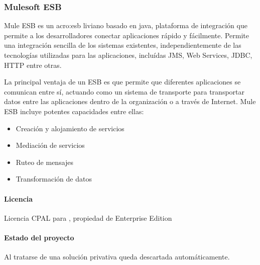 \subsubsection{Mulesoft ESB}
\label{soa:tecnologias:mulesoft-esb}

Mule ESB es un \gls{acro:esb} liviano basado en java, plataforma de integración que permite a los desarrolladores conectar aplicaciones rápido y fácilmente.  Permite una integración sencilla de los sistemas existentes, independientemente de las tecnologías utilizadas para las aplicaciones, incluídas JMS, Web Services, JDBC, HTTP entre otras.

La principal ventaja de un ESB es que permite que diferentes aplicaciones se comunican entre sí, actuando como un sistema de transporte para transportar datos entre las aplicaciones dentro de la organización o a través de Internet. Mule ESB incluye potentes capacidades entre ellas:

\begin{itemize}
  \item Creación y alojamiento de servicios
  \item Mediación de servicios
  \item Ruteo de mensajes
  \item Transformación de datos
\end{itemize}

\paragraph{Licencia}

Licencia CPAL para , propiedad de Enterprise Edition

\paragraph{Estado del proyecto}

Al tratarse de una solución privativa queda descartada automáticamente.
